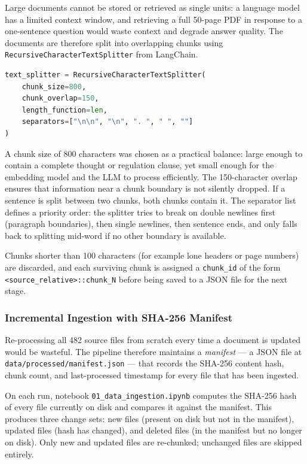 Large documents cannot be stored or retrieved as single units: a language model has a limited context window, and retrieving a full 50-page PDF in response to a one-sentence question would waste context and degrade answer quality. The documents are therefore split into overlapping chunks using \texttt{RecursiveCharacterTextSplitter} from LangChain.

\begin{lstlisting}[language=Python]
text_splitter = RecursiveCharacterTextSplitter(
    chunk_size=800,
    chunk_overlap=150,
    length_function=len,
    separators=["\n\n", "\n", ". ", " ", ""]
)
\end{lstlisting}

A chunk size of 800 characters was chosen as a practical balance: large enough to contain a complete thought or regulation clause, yet small enough for the embedding model and the LLM to process efficiently. The 150-character overlap ensures that information near a chunk boundary is not silently dropped. If a sentence is split between two chunks, both chunks contain it. The separator list defines a priority order: the splitter tries to break on double newlines first (paragraph boundaries), then single newlines, then sentence ends, and only falls back to splitting mid-word if no other boundary is available.

Chunks shorter than 100 characters (for example lone headers or page numbers) are discarded, and each surviving chunk is assigned a \texttt{chunk\_id} of the form \texttt{<source\_relative>::chunk\_N} before being saved to a JSON file for the next stage.

\subsubsection{Incremental Ingestion with SHA-256 Manifest}

Re-processing all 482 source files from scratch every time a document is updated would be wasteful. The pipeline therefore maintains a \emph{manifest} — a JSON file at \texttt{data/processed/manifest.json} — that records the SHA-256 content hash, chunk count, and last-processed timestamp for every file that has been ingested.

On each run, notebook \texttt{01\_data\_ingestion.ipynb} computes the SHA-256 hash of every file currently on disk and compares it against the manifest. This produces three change sets: new files (present on disk but not in the manifest), updated files (hash has changed), and deleted files (in the manifest but no longer on disk). Only new and updated files are re-chunked; unchanged files are skipped entirely.

